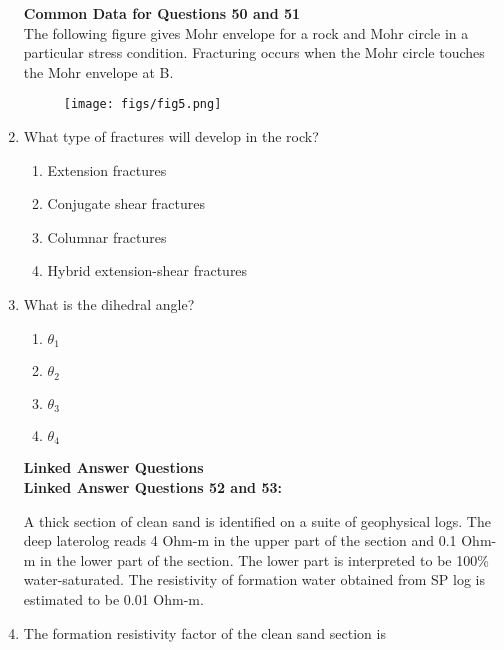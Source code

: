 \documentclass[journal,12pt,onecolumn]{IEEEtran}
\theoremstyle{remark}
\newcommand{\brak}[1]{\left[ #1 \right]}
\begin{document}
\begin{enumerate}
\textbf{Common Data for Questions 50 and 51}\\
The following figure gives Mohr envelope for a rock and Mohr circle in a particular stress condition. Fracturing occurs when the Mohr circle touches the Mohr envelope at B.

\begin{figure}[H]
\centering
\texttt{[image: figs/fig5.png]}
\caption{}
\label{fig:q50_mohr}
\end{figure}

\item What type of fractures will develop in the rock?

\hfill{\brak{\text{GATE GG 2012}}}

\begin{multicols}{2}
\begin{enumerate}
\item Extension fractures
\item Conjugate shear fractures
\item Columnar fractures
\item Hybrid extension-shear fractures
\end{enumerate}
\end{multicols}

\item  What is the dihedral angle?

\hfill{\brak{\text{GATE GG 2012}}}

\begin{multicols}{4}
\begin{enumerate}
\item $\theta_1$
\item $\theta_2$
\item $\theta_3$
\item $\theta_4$
\end{enumerate}
\end{multicols}

\textbf{Linked Answer Questions}\\
\textbf{Linked Answer Questions 52 and 53:}

A thick section of clean sand is identified on a suite of geophysical logs. The deep laterolog reads 4 Ohm-m in the upper part of the section and 0.1 Ohm-m in the lower part of the section. The lower part is interpreted to be 100\% water-saturated. The resistivity of formation water obtained from SP log is estimated to be 0.01 Ohm-m.

\item  The formation resistivity factor of the clean sand section is


\end{enumerate}
\end{document}
